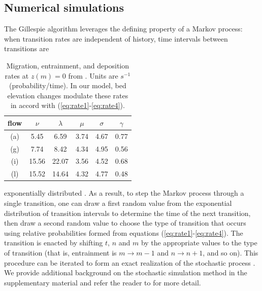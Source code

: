 \subsection{Numerical simulations}
\label{sec:numerical}

The Gillespie algorithm leverages the defining property of a Markov process: when transition rates are independent of history, time intervals between transitions are \begin{table}
	\caption{Migration, entrainment, and deposition rates at $z(m)=0$ from \citet{Ancey2008}. Units are $s^{-1}$ (probability/time). In our model, bed elevation changes modulate these rates in accord with (\ref{eq:rate1}-\ref{eq:rate4}).}\label{tab:anceyparams}
	\begin{tabular}{cccccc} \\ 
		\toprule  
		flow & $\nu$ & $\lambda$ & $\mu$ & $\sigma$ & $\gamma$ \\
		\midrule
		(a) & 5.45  & 6.59  & 3.74 & 4.67 & 0.77 \\
		\midrule
		(g) & 7.74  & 8.42  & 4.34 & 4.95 & 0.56 \\
		\midrule
		(i) & 15.56 & 22.07 & 3.56 & 4.52 & 0.68 \\
		\midrule
		(l) & 15.52 & 14.64 & 4.32 & 4.77 & 0.48 \\
		\bottomrule
	\end{tabular}
\end{table}exponentially distributed \citep{Cox1965}.
As a result, to step the Markov process through a single transition, one can draw a first random value from the exponential distribution of transition intervals to determine the time of the next transition,
then draw a second random value to choose the type of transition that occurs using relative probabilities formed from equations (\ref{eq:rate1}-\ref{eq:rate4}). The transition is enacted by shifting $t$, $n$ and $m$ by the appropriate values to the type of transition (that is, entrainment is $m\rightarrow m-1$ and $n \rightarrow n+1$, and so on).
This procedure can be iterated to form an exact realization of the stochastic process \citep{Gillespie2007}.
We provide additional background on the stochastic simulation method in the supplementary material and refer the reader to \citet{Gillespie2007} for more detail.

